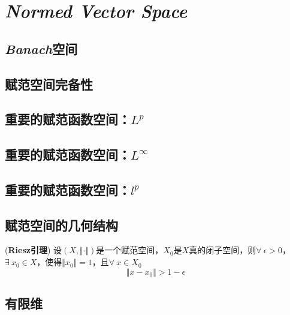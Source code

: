 \chapter{\textsl{Normed Vector Space}}

\section{\textsl{Banach}空间}

\section{赋范空间完备性}

\section{重要的赋范函数空间：$L^p$}


\section{重要的赋范函数空间：$L^\infty$}

\section{重要的赋范函数空间：$l^p$}

\section{赋范空间的几何结构}

\begin{mdframed}
    \begin{lemma}
        (\textbf{Riesz引理}) 设$(X,\Vert \cdot\Vert)$是一个赋范空间，$X_0$是$X$真的闭子空间，则$\forall\ \epsilon>0$，$\exists\ x_0\in X$，使得$\Vert x_0\Vert =1$，且$\forall\ x\in X_0$
        \begin{equation}
            \Vert x-x_0\Vert>1-\epsilon
        \end{equation}
    \end{lemma}
\end{mdframed}

\section{有限维}